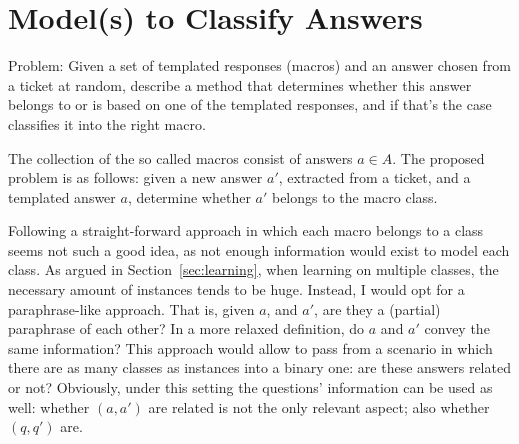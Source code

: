 \documentclass[11pt]{article}
\begin{document}


% 
% 

\section{Model(s) to Classify Answers}
\label{sec:answers}

Problem: Given a set of templated responses (macros) and an answer chosen from a 
ticket at random, describe a method that determines whether this answer belongs 
to or is based on one of the templated responses, and if that's the case 
classifies it into the right macro.
\medskip

The collection of the so called macros consist of answers $a\in A$. The proposed 
problem is as follows: given a new answer $a'$, extracted from a ticket, and a 
templated answer $a$,  determine whether $a'$ belongs to the macro class. 

Following a straight-forward approach in which each macro belongs to a class 
seems not such a good idea, as not enough information would exist to model each 
class. As argued in Section~\ref{sec:learning}, when learning on multiple 
classes, the necessary amount of instances tends to be huge. Instead, I would 
opt for a paraphrase-like approach. That is, given $a$, and $a'$, are they a 
(partial) paraphrase of each other? In a more relaxed definition, do $a$ and 
$a'$ convey the same information? This approach would allow to pass from a 
scenario in which there are as many classes as instances into a binary one: are 
these answers related or not? Obviously, under this setting the questions' 
information can be used as well: whether $(a,a')$ are related is not the only 
relevant aspect; also whether $(q,q')$ are. 
\end{document}
